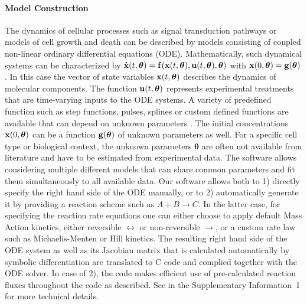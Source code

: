 \documentclass{bioinfo}
\begin{document}
\paragraph{Model Construction}
The dynamics of cellular processes such as signal transduction pathways or models of cell growth and death can be described by models consisting of coupled non-linear ordinary differential equations (ODE). Mathematically, such dynamical systems can be characterized by 
${\bf \dot  x}(t,{\boldsymbol \theta}) = {\bf f}({\bf x}(t,{\boldsymbol \theta}),{\bf u}(t,{\boldsymbol \theta}),{\boldsymbol \theta})$
with ${\bf x}(0,{\boldsymbol \theta}) = {\bf g}(\boldsymbol{\theta})$. In this case the vector of state variables ${\bf x}(t,{\boldsymbol \theta})$ describes the dynamics of molecular components. The function ${\bf u}(t,{\boldsymbol \theta})$ represents experimental treatments that are time-varying inputs to the ODE systems. A variety of predefined function such as step functions, pulses, splines or custom defined functions are available that can depend on unknown parameters \citep{Schelker:2012uq}. The initial concentrations ${\bf x}(0,{\boldsymbol \theta})$ can be a function ${\bf g}(\boldsymbol{\theta})$ of unknown parameters as well. For a specific cell type or biological context, the unknown parameters ${\boldsymbol \theta}$ are often not available from literature and have to be estimated from experimental data. The software allows considering multiple different models that can share common parameters and fit them simultaneously to all available data. Our software allows both to 1) directly specify the right hand side of the ODE manually, or to 2) automatically generate it by  providing a reaction scheme such as $A + B \rightarrow C$. In the latter case, for specifying the reaction rate equations one can either choose to apply default Mass Action kinetics, either reversible $\leftrightarrow$ or non-reversible $\rightarrow$, or a custom rate law such as Michaelis-Menten or Hill kinetics. The resulting right hand side of the ODE system as well as its Jacobian matrix that is calculated automatically by symbolic differentiation are translated to C code and complied together with the ODE solver. In case of 2), the code makes efficient use of pre-calculated reaction fluxes throughout the code as described. See in the Supplementary Information~1 for more technical details. 
\end{document}
